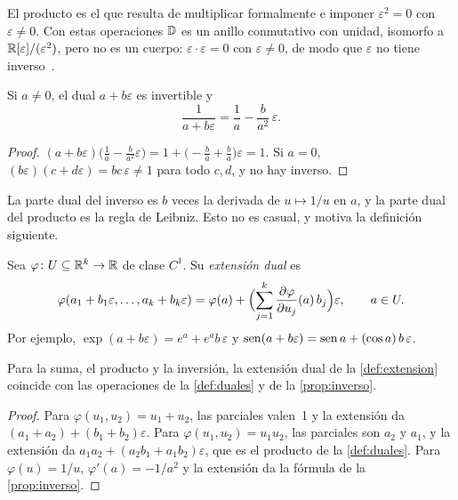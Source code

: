 El producto es el que resulta de multiplicar formalmente e imponer $\varepsilon^{2}=0$ con $\varepsilon\ne 0$. Con estas operaciones $\mathbb{D}$ es un anillo conmutativo con unidad, isomorfo a $\mathbb{R}[\varepsilon]/(\varepsilon^{2})$, pero no es un cuerpo: $\varepsilon\cdot\varepsilon=0$ con $\varepsilon\ne 0$, de modo que $\varepsilon$ no tiene inverso~\cite[§3.1.1]{baydin}.

\begin{proposicion}\label{prop:inverso}
Si $a\ne 0$, el dual $a+b\varepsilon$ es invertible y
\[
\frac{1}{a+b\varepsilon}=\frac1a-\frac{b}{a^{2}}\,\varepsilon .
\]
\end{proposicion}

\begin{proof}
$(a+b\varepsilon)\bigl(\tfrac1a-\tfrac{b}{a^{2}}\varepsilon\bigr)=1+\bigl(-\tfrac{b}{a}+\tfrac{b}{a}\bigr)\varepsilon=1$. Si $a=0$, $(b\varepsilon)(c+d\varepsilon)=bc\,\varepsilon\ne 1$ para todo $c,d$, y no hay inverso.
\end{proof}

La parte dual del inverso es $b$ veces la derivada de $u\mapsto 1/u$ en $a$, y la parte dual del producto es la regla de Leibniz. Esto no es casual, y motiva la definición siguiente.

\begin{definicion}\label{def:extension}
Sea $\varphi\colon U\subseteq\mathbb{R}^{k}\to\mathbb{R}$ de clase $C^{1}$. Su \emph{extensión dual} es
\[
\varphi(a_1+b_1\varepsilon,\dots,a_k+b_k\varepsilon)=\varphi(a)+\Bigl(\sum_{j=1}^{k}\frac{\partial\varphi}{\partial u_j}(a)\,b_j\Bigr)\varepsilon ,\qquad a\in U.
\]
Por ejemplo, $\exp(a+b\varepsilon)=e^{a}+e^{a}b\,\varepsilon$ y $\operatorname{sen}(a+b\varepsilon)=\operatorname{sen} a+(\cos a)\,b\,\varepsilon$.
\end{definicion}

\begin{proposicion}\label{prop:coherencia}
Para la suma, el producto y la inversión, la extensión dual de la \cref{def:extension} coincide con las operaciones de la \cref{def:duales} y de la \cref{prop:inverso}.
\end{proposicion}

\begin{proof}
Para $\varphi(u_1,u_2)=u_1+u_2$, las parciales valen~1 y la extensión da $(a_1+a_2)+(b_1+b_2)\varepsilon$. Para $\varphi(u_1,u_2)=u_1u_2$, las parciales son $a_2$ y $a_1$, y la extensión da $a_1a_2+(a_2b_1+a_1b_2)\varepsilon$, que es el producto de la \cref{def:duales}. Para $\varphi(u)=1/u$, $\varphi'(a)=-1/a^{2}$ y la extensión da la fórmula de la \cref{prop:inverso}.
\end{proof}

